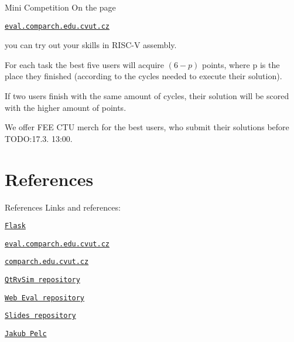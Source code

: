 \documentclass{beamer}
\begin{document}
	\begin{frame}{Mini Competition}
		On the page \par
		{\centering \texttt{\href{http://eval.comparch.edu.cvut.cz}{eval.comparch.edu.cvut.cz}} \par}
		you can try out your skills in RISC-V assembly. \par

		For each task the best five users will acquire $(6 - p)$ points, where p is the place they finished (according to the cycles needed to execute their solution).\par
		
		If two users finish with the same amount of cycles, their solution will be scored with the higher amount of points. \par

		We offer FEE CTU merch for the best users, who submit their solutions before TODO:17.3. 13:00. \par
	\end{frame}

	\section{References}

	\begin{frame}{References}
		Links and references: \par
		{\centering \texttt{\href{https://flask.palletsprojects.com/en/3.0.x/}{Flask}} \par}
		{\centering \texttt{\href{http://eval.comparch.edu.cvut.cz}{eval.comparch.edu.cvut.cz}} \par}
		{\centering \texttt{\href{http://comparch.edu.cvut.cz}{comparch.edu.cvut.cz}} \par}
		{\centering \texttt{\href{https://github.com/cvut/qtrvsim}{QtRvSim repository}} \par}
		{\centering \texttt{\href{https://gitlab.fel.cvut.cz/b35apo/qtrvsim-eval-web}{Web Eval repository}} \par}
		{\centering \texttt{\href{https://github.com/kubakubakuba/if24-flask-web-eval}{Slides repository}} \par}
		{\centering \texttt{\href{https://swpelc.eu}{Jakub Pelc}} \par}
	\end{frame}
\end{document}
